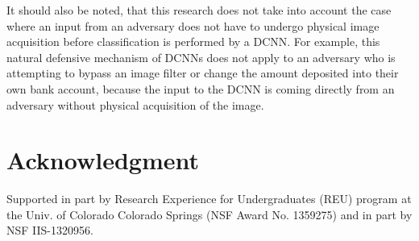\documentclass[conference]{IEEEtran}
\begin{document}
It should also be noted, that this research does not take into account the case where an input from an adversary does not have to undergo physical image acquisition before classification is performed by a DCNN.  For example, this natural defensive mechanism of DCNNs does not apply to an adversary who is attempting to bypass an image filter or change the amount deposited into their own bank account, because the input to the DCNN is coming directly from an adversary without physical acquisition of the image.


\section*{Acknowledgment}

Supported in part by Research Experience for Undergraduates (REU) program at the Univ. of Colorado Colorado Springs (NSF Award No. 1359275) and in part by NSF IIS-1320956.




\end{document}
